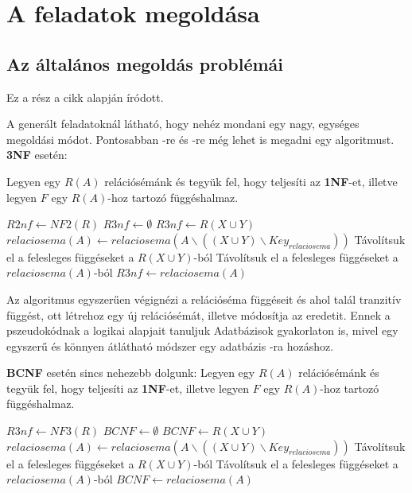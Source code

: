 \chapter{A feladatok megoldása}

\section{Az általános megoldás problémái}

Ez a rész a \cite{normalcikk} cikk alapján íródott.

A generált feladatoknál látható, hogy nehéz mondani egy nagy, egységes megoldási módot. Pontosabban \nfh-re és \BCNF-re még lehet is megadni egy algoritmust. \textbf{3NF} esetén: \par
Legyen egy $R(A)$ relációsémánk és tegyük fel, hogy teljesíti az \textbf{1NF}-et, illetve legyen $F$ egy $R(A)$-hoz tartozó függéshalmaz.
\hfill \break
\begin{algorithmic}
        \State $R2nf \gets NF2(R)$
        \State $R3nf \gets \emptyset$
                    \State $R3nf \gets R(X\cup Y)$
                    \State $relaciosema(A) \gets relaciosema(A \backslash ((X\cup Y) \backslash Key_{relaciosema}))$ 
                    \State Távolítsuk el a felesleges függéseket a $R(X \cup Y)$-ból
                \EndIf
            \EndFor
            \State Távolítsuk el a felesleges függéseket a $relaciosema(A)$-ból
            \State $R3nf \gets relaciosema(A)$
        \EndFor
    \EndFunction
\end{algorithmic}
\hfill \break
Az algoritmus egyszerűen végignézi a relációséma függéseit és ahol talál tranzitív függést, ott létrehoz egy új relációsémát, illetve módosítja az eredetit. Ennek a pszeudokódnak a logikai alapjait tanuljuk Adatbázisok gyakorlaton is, mivel egy egyszerű és könnyen átlátható módszer egy adatbázis \nfh-ra hozáshoz. \par
\textbf{BCNF} esetén sincs nehezebb dolgunk:
Legyen egy $R(A)$ relációsémánk és tegyük fel, hogy teljesíti az \textbf{1NF}-et, illetve legyen $F$ egy $R(A)$-hoz tartozó függéshalmaz.
\hfill \break
\begin{algorithmic}
        \State $R3nf \gets NF3(R)$
        \State $BCNF \gets \emptyset$
                    \State $BCNF \gets R(X\cup Y)$
                    \State $relaciosema(A) \gets relaciosema(A \backslash ((X\cup Y) \backslash Key_{relaciosema}))$ 
                    \State Távolítsuk el a felesleges függéseket a $R(X \cup Y)$-ból
                \EndIf
            \EndFor
            \State Távolítsuk el a felesleges függéseket a $relaciosema(A)$-ból
            \State $BCNF \gets relaciosema(A)$
        \EndFor
    \EndFunction
\end{algorithmic}
